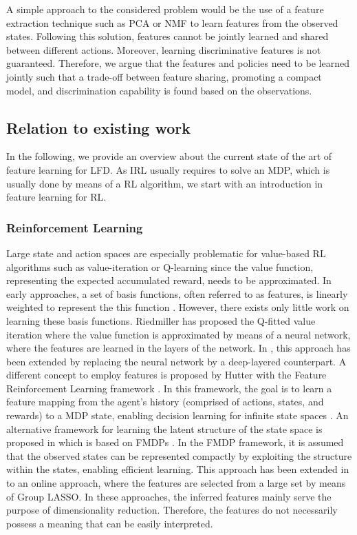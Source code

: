\documentclass{article}
\begin{document}
A simple approach to the considered problem would be the use of a feature extraction technique such as \ac{PCA} \cite{Jolliffe2002} or \ac{NMF} \cite{Lee2001} to learn features from the observed states. 
Following this solution, features cannot be jointly learned and shared between different actions. Moreover, learning discriminative features is not guaranteed. 
Therefore, we argue that the features and policies need to be learned jointly such that a trade-off between feature sharing, promoting a compact model, and discrimination capability is found based on the observations.

\subsection{Relation to existing work}
In the following, we provide an overview about the current state of the art of feature learning for \ac{LFD}. As \ac{IRL} usually requires to solve an \ac{MDP}, which is usually done by means of a \ac{RL} algorithm, we start with an introduction in feature learning for \ac{RL}.

\subsubsection{Reinforcement Learning}
Large state and action spaces are especially problematic for value-based \ac{RL} algorithms such as value-iteration \cite{Bellman1957} or Q-learning \cite{Watkins1989} since the value function, representing the expected accumulated reward, needs to be approximated.
In early approaches, a set of basis functions, often referred to as features, is linearly weighted to represent the this function \cite{Bradtke1996}. 
However, there exists only little work on learning these basis functions. 
Riedmiller \cite{Riedmiller2005} has proposed the Q-fitted value iteration where the value function is approximated by means of a neural network, where the features are learned in the layers of the network.
In \cite{Mnih2015}, this approach has been extended by replacing the neural network by a deep-layered counterpart. 
A different concept to employ features is proposed by Hutter with the Feature Reinforcement Learning framework \cite{Hutter2009}. 
In this framework, the goal is to learn a feature mapping from the agent's history (comprised of actions, states, and rewards) to a \ac{MDP} state, enabling decision learning for infinite state spaces \cite{Daswani2014}. 
An alternative framework for learning the latent structure of the state space is proposed in \cite{Degris2006} which is based on \acp{FMDP} \cite{Boutilier1995}. 
In the \ac{FMDP} framework, it is assumed that the observed states can be represented compactly by exploiting the structure within the states, enabling efficient learning.
This approach has been extended in \cite{Nguyen2013} to an online approach, where the features are selected from a large set by means of Group LASSO.
In these approaches, the inferred features mainly serve the purpose of dimensionality reduction.
Therefore, the features do not necessarily possess a meaning that can be easily interpreted. 
\end{document}
